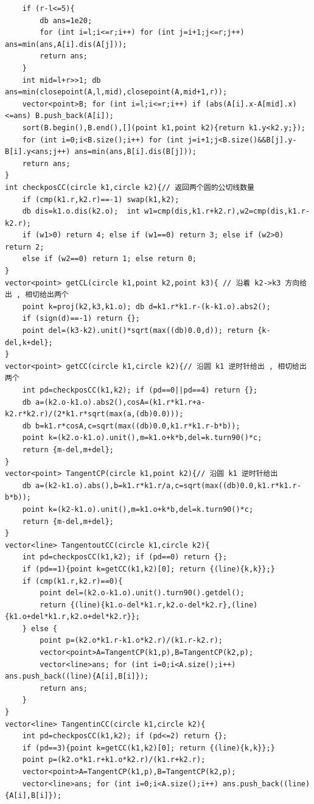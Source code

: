 \documentclass[twoside]{article}
\begin{document}
\begin{lstlisting}
    if (r-l<=5){
        db ans=1e20;
        for (int i=l;i<=r;i++) for (int j=i+1;j<=r;j++) ans=min(ans,A[i].dis(A[j]));
        return ans;
    }
    int mid=l+r>>1; db ans=min(closepoint(A,l,mid),closepoint(A,mid+1,r));
    vector<point>B; for (int i=l;i<=r;i++) if (abs(A[i].x-A[mid].x)<=ans) B.push_back(A[i]);
    sort(B.begin(),B.end(),[](point k1,point k2){return k1.y<k2.y;});
    for (int i=0;i<B.size();i++) for (int j=i+1;j<B.size()&&B[j].y-B[i].y<ans;j++) ans=min(ans,B[i].dis(B[j]));
    return ans;
}
int checkposCC(circle k1,circle k2){// 返回两个圆的公切线数量
    if (cmp(k1.r,k2.r)==-1) swap(k1,k2);
    db dis=k1.o.dis(k2.o);  int w1=cmp(dis,k1.r+k2.r),w2=cmp(dis,k1.r-k2.r);
    if (w1>0) return 4; else if (w1==0) return 3; else if (w2>0) return 2; 
    else if (w2==0) return 1; else return 0;
}
vector<point> getCL(circle k1,point k2,point k3){ // 沿着 k2->k3 方向给出 , 相切给出两个 
    point k=proj(k2,k3,k1.o); db d=k1.r*k1.r-(k-k1.o).abs2();
    if (sign(d)==-1) return {};
    point del=(k3-k2).unit()*sqrt(max((db)0.0,d)); return {k-del,k+del};
}
vector<point> getCC(circle k1,circle k2){// 沿圆 k1 逆时针给出 , 相切给出两个 
    int pd=checkposCC(k1,k2); if (pd==0||pd==4) return {};
    db a=(k2.o-k1.o).abs2(),cosA=(k1.r*k1.r+a-k2.r*k2.r)/(2*k1.r*sqrt(max(a,(db)0.0)));
    db b=k1.r*cosA,c=sqrt(max((db)0.0,k1.r*k1.r-b*b));
    point k=(k2.o-k1.o).unit(),m=k1.o+k*b,del=k.turn90()*c;
    return {m-del,m+del};
} 
vector<point> TangentCP(circle k1,point k2){// 沿圆 k1 逆时针给出 
    db a=(k2-k1.o).abs(),b=k1.r*k1.r/a,c=sqrt(max((db)0.0,k1.r*k1.r-b*b));
    point k=(k2-k1.o).unit(),m=k1.o+k*b,del=k.turn90()*c;
    return {m-del,m+del};
} 
vector<line> TangentoutCC(circle k1,circle k2){
    int pd=checkposCC(k1,k2); if (pd==0) return {}; 
    if (pd==1){point k=getCC(k1,k2)[0]; return {(line){k,k}};}
    if (cmp(k1.r,k2.r)==0){
        point del=(k2.o-k1.o).unit().turn90().getdel();
        return {(line){k1.o-del*k1.r,k2.o-del*k2.r},(line){k1.o+del*k1.r,k2.o+del*k2.r}};
    } else {
        point p=(k2.o*k1.r-k1.o*k2.r)/(k1.r-k2.r);
        vector<point>A=TangentCP(k1,p),B=TangentCP(k2,p);
        vector<line>ans; for (int i=0;i<A.size();i++) ans.push_back((line){A[i],B[i]}); 
        return ans;
    }
}
vector<line> TangentinCC(circle k1,circle k2){
    int pd=checkposCC(k1,k2); if (pd<=2) return {};
    if (pd==3){point k=getCC(k1,k2)[0]; return {(line){k,k}};} 
    point p=(k2.o*k1.r+k1.o*k2.r)/(k1.r+k2.r);
    vector<point>A=TangentCP(k1,p),B=TangentCP(k2,p);
    vector<line>ans; for (int i=0;i<A.size();i++) ans.push_back((line){A[i],B[i]}); 

\end{lstlisting}
\end{document}
